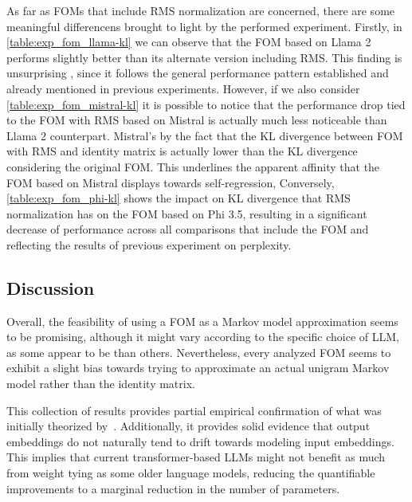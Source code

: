 As far as FOMs that include RMS normalization are concerned, there are some meaningful differencens brought to light by the performed experiment.
Firstly, in \cref{table:exp_fom_llama-kl} we can observe that the FOM based on Llama 2 performs slightly better than its alternate version including RMS.
This finding is unsurprising , since it follows the general performance pattern established and already mentioned in previous experiments.
However, if we also consider \cref{table:exp_fom_mistral-kl} it is possible to notice that the performance drop tied to the FOM with RMS based on Mistral is actually much less noticeable than  Llama 2 counterpart.
Mistral's  by the fact that the KL divergence between FOM with RMS and identity matrix is actually lower than the KL divergence considering the original FOM.
This underlines the apparent affinity that the FOM based on Mistral displays towards self-regression,
Conversely, \cref{table:exp_fom_phi-kl} shows the  impact on KL divergence that RMS normalization has on the FOM based  on Phi 3.5, resulting in a significant decrease of performance across all comparisons that include the FOM and reflecting the results of  previous experiment on perplexity.

\subsection{Discussion}\label{ssec:exp_fom_discussion}

Overall, the feasibility of using a FOM as a Markov model approximation seems to be promising, although it might vary according to the specific choice of LLM, as some appear to be  than others.
Nevertheless, every analyzed FOM seems to exhibit a slight bias towards trying to approximate an actual unigram Markov model rather than the identity matrix.

This collection of results provides partial empirical confirmation of what was initially theorized by~\citet{elhage2021}.
Additionally, it provides solid evidence that output embeddings do not naturally tend to drift towards modeling input embeddings.
This implies that current transformer-based LLMs might not benefit as much from weight tying as some older language models, reducing the quantifiable improvements to a marginal reduction in the number of parameters.

